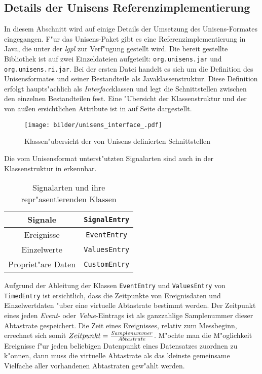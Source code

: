 \subsection{Details der Unisens Referenzimplementierung}

In diesem Abschnitt wird auf einige Details der Umsetzung des Unisens-Formates eingegangen.
F"ur das Unisens-Paket gibt es eine Referenzimplementierung in Java, die unter der \emph{\ac{lgpl}} zur Verf"ugung gestellt wird.
Die bereit gestellte Bibliothek ist auf zwei Einzeldateien aufgeteilt: \verb|org.unisens.jar| und \verb|org.unisens.ri.jar|.
Bei der ersten Datei handelt es sich um die Definition des Unisensformates und seiner Bestandteile als Javaklassenstruktur.
Diese Definition erfolgt haupts"achlich als \emph{Interface}klassen und legt die Schnittstellen zwischen den einzelnen Bestandteilen fest.
Eine "Ubersicht der Klassenstruktur und der von au\ss en ersichtlichen Attribute ist in  auf Seite \pageref{pic:unisens_interface} dargestellt.
\begin{sidewaysfigure}%
\centering
\texttt{[image: bilder/unisens\_interface\_.pdf]}
\caption{Klassen"ubersicht der von Unisens definierten Schnittstellen}
\label{pic:unisens_interface}
\end{sidewaysfigure}
Die vom Unisensformat unterst"utzten Signalarten sind auch in der Klassenstruktur in  erkennbar.
\begin{table}[h]
\centering
\begin{tabular}{|c|c|}
	\hline Signale & \verb|SignalEntry| \\
	\hline Ereignisse & \verb|EventEntry| \\
	\hline Einzelwerte & \verb|ValuesEntry| \\
	\hline Propriet"are Daten & \verb|CustomEntry| \\
	\hline
\end{tabular}
\caption{Signalarten und ihre repr"asentierenden Klassen}
\label{tab:unisens_signalklassen}
\end{table}

Aufgrund der Ableitung der Klassen \verb|EventEntry| und \verb|ValuesEntry| von \verb|TimedEntry| ist ersichtlich, dass die Zeitpunkte von Ereignisdaten und Einzelwertdaten "uber eine virtuelle Abtastrate bestimmt werden.
Der Zeitpunkt eines jeden \emph{Event}- oder \emph{Value}-Eintrags ist als ganzzahlige Samplenummer dieser Abtastrate gespeichert.
Die Zeit eines Ereignisses, relativ zum Messbeginn, errechnet sich somit $Zeitpunkt = {Samplenummer \over Abtastrate}$.
M"ochte man die M"oglichkeit Ereignisse f"ur jeden beliebigen Datenpunkt eines Datensatzes zuordnen zu k"onnen, dann muss die virtuelle Abtastrate als das kleinste gemeinsame Vielfache aller vorhandenen Abtastraten gew"ahlt werden.

